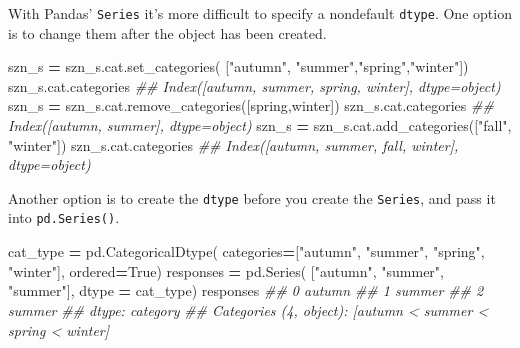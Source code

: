 \documentclass[
  12pt,
  krantz2]{krantz}
\makeatletter
\newenvironment{Shaded}{\begin{snugshade}}{\end{snugshade}}
\newcommand{\CommentTok}[1]{\textcolor[rgb]{0.37,0.37,0.37}{\textit{#1}}}
\newcommand{\NormalTok}[1]{#1}
\newcommand{\OperatorTok}[1]{\textcolor[rgb]{0.43,0.43,0.43}{\textbf{#1}}}
\newcommand{\StringTok}[1]{\textcolor[rgb]{0.5,0.5,0.5}{#1}}
\newcommand{\VariableTok}[1]{\textcolor[rgb]{0,0,0}{#1}}
\newenvironment{kframe}{%
\medskip{}
\setlength{\fboxsep}{.8em}
 \def\at@end@of@kframe{}%
 \ifinner\ifhmode%
  \def\at@end@of@kframe{\end{minipage}}%
  \begin{minipage}{\columnwidth}%
 \fi\fi%
 \def\FrameCommand##1{\hskip\@totalleftmargin \hskip-\fboxsep
 \colorbox{shadecolor}{##1}\hskip-\fboxsep
     \hskip-\linewidth \hskip-\@totalleftmargin \hskip\columnwidth}%
 \MakeFramed {\advance\hsize-\width
   \@totalleftmargin\z@ \linewidth\hsize
   \@setminipage}}%
 {\par\unskip\endMakeFramed%
 \at@end@of@kframe}
\renewenvironment{Shaded}{\begin{kframe}}{\end{kframe}}
\makeatother
\begin{document}
With Pandas' \texttt{Series} it's more difficult to specify a nondefault \texttt{dtype}. One option is to change them after the object has been created.

\begin{Shaded}
\begin{Highlighting}[]
\NormalTok{szn\_s }\OperatorTok{=}\NormalTok{ szn\_s.cat.set\_categories(}
\NormalTok{  [}\StringTok{"autumn"}\NormalTok{, }\StringTok{"summer"}\NormalTok{,}\StringTok{"spring"}\NormalTok{,}\StringTok{"winter"}\NormalTok{])}
\NormalTok{szn\_s.cat.categories}
\CommentTok{\#\# Index([\textquotesingle{}autumn\textquotesingle{}, \textquotesingle{}summer\textquotesingle{}, \textquotesingle{}spring\textquotesingle{}, \textquotesingle{}winter\textquotesingle{}], dtype=\textquotesingle{}object\textquotesingle{})}
\NormalTok{szn\_s }\OperatorTok{=}\NormalTok{ szn\_s.cat.remove\_categories([}\StringTok{\textquotesingle{}spring\textquotesingle{}}\NormalTok{,}\StringTok{\textquotesingle{}winter\textquotesingle{}}\NormalTok{])}
\NormalTok{szn\_s.cat.categories}
\CommentTok{\#\# Index([\textquotesingle{}autumn\textquotesingle{}, \textquotesingle{}summer\textquotesingle{}], dtype=\textquotesingle{}object\textquotesingle{})}
\NormalTok{szn\_s }\OperatorTok{=}\NormalTok{ szn\_s.cat.add\_categories([}\StringTok{"fall"}\NormalTok{, }\StringTok{"winter"}\NormalTok{])}
\NormalTok{szn\_s.cat.categories}
\CommentTok{\#\# Index([\textquotesingle{}autumn\textquotesingle{}, \textquotesingle{}summer\textquotesingle{}, \textquotesingle{}fall\textquotesingle{}, \textquotesingle{}winter\textquotesingle{}], dtype=\textquotesingle{}object\textquotesingle{})}
\end{Highlighting}
\end{Shaded}

Another option is to create the \texttt{dtype} before you create the \texttt{Series}, and pass it into \texttt{pd.Series()}.

\begin{Shaded}
\begin{Highlighting}[]
\NormalTok{cat\_type }\OperatorTok{=}\NormalTok{ pd.CategoricalDtype(}
\NormalTok{  categories}\OperatorTok{=}\NormalTok{[}\StringTok{"autumn"}\NormalTok{, }\StringTok{"summer"}\NormalTok{, }\StringTok{"spring"}\NormalTok{, }\StringTok{"winter"}\NormalTok{],}
\NormalTok{  ordered}\OperatorTok{=}\VariableTok{True}\NormalTok{)}
\NormalTok{responses }\OperatorTok{=}\NormalTok{ pd.Series(}
\NormalTok{  [}\StringTok{"autumn"}\NormalTok{, }\StringTok{"summer"}\NormalTok{, }\StringTok{"summer"}\NormalTok{], }
\NormalTok{  dtype }\OperatorTok{=}\NormalTok{ cat\_type)}
\NormalTok{responses}
\CommentTok{\#\# 0    autumn}
\CommentTok{\#\# 1    summer}
\CommentTok{\#\# 2    summer}
\CommentTok{\#\# dtype: category}
\CommentTok{\#\# Categories (4, object): [\textquotesingle{}autumn\textquotesingle{} \textless{} \textquotesingle{}summer\textquotesingle{} \textless{} \textquotesingle{}spring\textquotesingle{} \textless{} \textquotesingle{}winter\textquotesingle{}]}
\end{Highlighting}
\end{Shaded}
\end{document}
